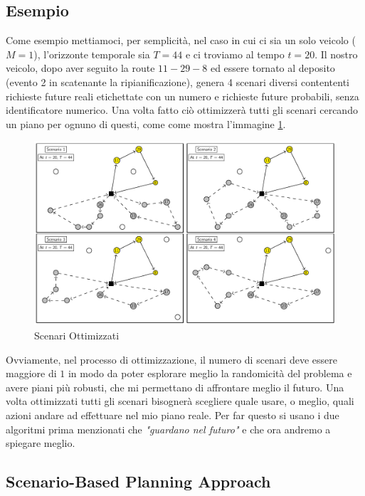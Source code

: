 \documentclass[
    article,            %
    12pt,                %
    oneside,            %
    a4paper,            %
    english,            %
    italian,                %
    sumario=tradicional,
]{abntex2}
\begin{document}
\subsection{Esempio}
Come esempio mettiamoci, per semplicità, nel caso in cui ci sia un solo veicolo ($M=1$), l'orizzonte temporale sia $T = 44$ e ci troviamo al tempo $t=20$. Il nostro veicolo, dopo aver seguito la route {\(11 - 29 - 8\)} ed essere tornato al deposito (evento 2 in  scatenante la ripianificazione), genera 4 scenari diversi contententi richieste future reali etichettate con un numero e richieste future probabili, senza identificatore numerico. Una volta fatto ciò ottimizzerà tutti gli scenari cercando un piano per ognuno di questi, come come mostra l'immagine \ref{fig:optimizedScenario}. 
\begin{figure}[h!]
    \centering
    \includegraphics[scale=0.4]{Images/OptimizedScenario.png}
    \caption{Scenari Ottimizzati}
    \label{fig:optimizedScenario}
\end{figure}
\newline
Ovviamente, nel processo di ottimizzazione, il numero di scenari deve essere maggiore di $1$ in modo da poter esplorare meglio la randomicità del problema e avere piani più robusti, che mi permettano di affrontare meglio il futuro. Una volta ottimizzati tutti gli scenari  bisognerà scegliere quale usare, o meglio, quali azioni andare ad effettuare nel mio piano reale. Per far questo si usano i due algoritmi prima menzionati che \textit{"guardano nel futuro"} e che ora andremo a spiegare meglio.

\hypertarget{sbpa}{%
\subsection{Scenario-Based Planning Approach}\label{sbpa}}
\end{document}
